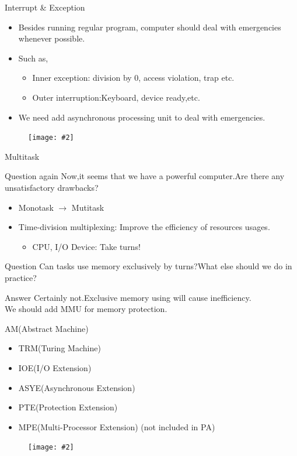 \documentclass{beamer}
\newcommand{\fignocaption}[2]{
	\begin{figure}[htp]
		\centering
		\texttt{[image: \#2]}
	\end{figure}
}
\begin{document}
\begin{frame}{Interrupt \& Exception}
	\begin{itemize}
		\item Besides running regular program, computer should deal with emergencies whenever possible.
		\item Such as,
		\begin{itemize}
			\item Inner exception: division by 0, access violation, trap etc.
			\item Outer interruption:Keyboard, device ready,etc.
		\end{itemize}	
		\item	\alert{We need add asynchronous processing unit to deal with emergencies.}
	\end{itemize}
	\fignocaption{scale=0.4}{interrupt.png}
\end{frame}

\begin{frame}{Multitask}
\begin{block}{Question again}
	Now,it seems that we have a powerful computer.Are there any unsatisfactory drawbacks?
\end{block}
\pause
\begin{itemize}
	\item Monotask $\longrightarrow$ Mutitask
	\item \alert{Time-division multiplexing}: Improve the efficiency of resources usages.
	\begin{itemize}
		\item CPU, I/O Device: Take turns!
	\end{itemize}
\end{itemize}
\begin{block}{Question}
	Can tasks use memory exclusively by turns?What else should we do in practice? 
\end{block}
\pause
\begin{alertblock}{Answer}
	Certainly not.Exclusive memory using will cause inefficiency.\\
\alert{We should add MMU for memory protection}.
\end{alertblock}

\end{frame}

\begin{frame}{AM(Abstract Machine)}
\begin{itemize}
	\item TRM(Turing Machine)
	\item IOE(I/O Extension)
	\item ASYE(Asynchronous Extension)
	\item PTE(Protection Extension)
	\item MPE(Multi-Processor Extension) (not included in PA)
\end{itemize}
\fignocaption{scale=0.4}{am.png}
\end{frame}
\end{document}
